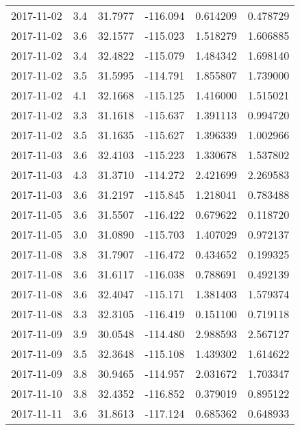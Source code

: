 \begin{tabular}{lrrrrr}
2017-11-02 &       3.4 &  31.7977 &  -116.094 &         0.614209 &         0.478729 \\
2017-11-02 &       3.6 &  32.1577 &  -115.023 &         1.518279 &         1.606885 \\
2017-11-02 &       3.4 &  32.4822 &  -115.079 &         1.484342 &         1.698140 \\
2017-11-02 &       3.5 &  31.5995 &  -114.791 &         1.855807 &         1.739000 \\
2017-11-02 &       4.1 &  32.1668 &  -115.125 &         1.416000 &         1.515021 \\
2017-11-02 &       3.3 &  31.1618 &  -115.637 &         1.391113 &         0.994720 \\
2017-11-02 &       3.5 &  31.1635 &  -115.627 &         1.396339 &         1.002966 \\
2017-11-03 &       3.6 &  32.4103 &  -115.223 &         1.330678 &         1.537802 \\
2017-11-03 &       4.3 &  31.3710 &  -114.272 &         2.421699 &         2.269583 \\
2017-11-03 &       3.6 &  31.2197 &  -115.845 &         1.218041 &         0.783488 \\
2017-11-05 &       3.6 &  31.5507 &  -116.422 &         0.679622 &         0.118720 \\
2017-11-05 &       3.0 &  31.0890 &  -115.703 &         1.407029 &         0.972137 \\
2017-11-08 &       3.8 &  31.7907 &  -116.472 &         0.434652 &         0.199325 \\
2017-11-08 &       3.6 &  31.6117 &  -116.038 &         0.788691 &         0.492139 \\
2017-11-08 &       3.6 &  32.4047 &  -115.171 &         1.381403 &         1.579374 \\
2017-11-08 &       3.3 &  32.3105 &  -116.419 &         0.151100 &         0.719118 \\
2017-11-09 &       3.9 &  30.0548 &  -114.480 &         2.988593 &         2.567127 \\
2017-11-09 &       3.5 &  32.3648 &  -115.108 &         1.439302 &         1.614622 \\
2017-11-09 &       3.8 &  30.9465 &  -114.957 &         2.031672 &         1.703347 \\
2017-11-10 &       3.8 &  32.4352 &  -116.852 &         0.379019 &         0.895122 \\
2017-11-11 &       3.6 &  31.8613 &  -117.124 &         0.685362 &         0.648933 \\

\end{tabular}

